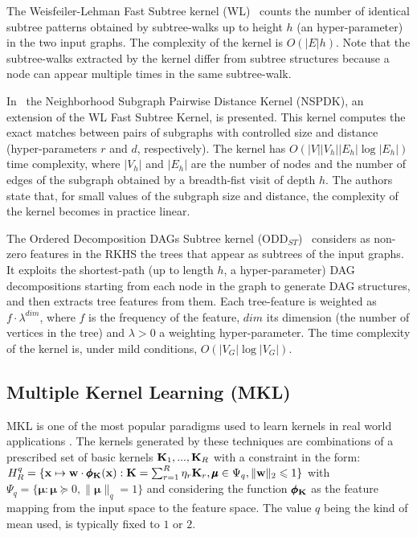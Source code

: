\documentclass{esannV2}
\newcommand{\xx}{{\bf x}}
\newcommand{\KK}{{\bf K}}
\newcommand{\1}{{\bf 1}}
\newcommand{\mmu}{\pmb{\mu}}
\newcommand{\pphi}{\pmb{\phi}}
\begin{document}
The Weisfeiler-Lehman Fast Subtree kernel (WL)~\cite{Shervashidze2011}  counts the number of identical subtree patterns obtained by subtree-walks up to height $h$ (an hyper-parameter) in the two input graphs. The complexity of the kernel is $O(|E|h)$. 
Note that the subtree-walks extracted by the kernel differ from  subtree structures because a node can appear multiple times in the same subtree-walk.

In~\cite{Costa2010} the Neighborhood Subgraph Pairwise Distance Kernel (NSPDK), an extension of the WL Fast Subtree Kernel, is presented. This kernel computes the exact matches between pairs of subgraphs with controlled size and distance (hyper-parameters $r$ and $d$, respectively). 
The kernel has $O(|V| |V_h| |E_h| \log |E_h|)$ time complexity, where $|V_h|$ and $|E_h|$ are the number of nodes and the number of edges of the subgraph obtained by a breadth-fist visit of depth $h$. 
The authors state that, for small values of the subgraph size and distance, the complexity of the kernel becomes in practice linear.

The Ordered Decomposition DAGs Subtree kernel (ODD$_{ST}$)~\cite{Dasan2012,DaSanMartino2016} considers as non-zero features in the RKHS the trees that appear as subtrees of the input graphs.
It exploits the shortest-path (up to length $h$, a hyper-parameter) DAG decompositions starting from each node in the graph to generate DAG structures, and then extracts tree features from them.
Each tree-feature is weighted as $f \cdot \lambda^{dim}$, where $f$ is the frequency of the feature, $dim$ its dimension (the number of vertices in the tree) and $\lambda>0$ a weighting hyper-parameter.
The time complexity of the kernel is, under mild conditions, $O(|V_G| \log |V_G|)$.%

\subsection{Multiple Kernel Learning (MKL)}
\label{MKL}
MKL \cite{Bach2004,Gonen2011} is one of the most popular paradigms used to learn kernels in real world applications \cite{Bucak2014,Castro2014}. %
The kernels generated by these techniques are combinations of a prescribed set of basic kernels $\KK_1,...,\KK_R$ with a constraint in the form:
$
	H_R^q = \{ \xx \mapsto \textbf{w} \cdot \pphi_\KK(\xx) : \KK = \sum_{r=1}^R \eta_r \KK_r, \mmu \in \Psi_q, \|\textbf{w}\|_2 \leqslant 1 \}
$
with $\Psi_q = \{ \mmu : \mmu \succcurlyeq 0, \| \mmu \|_q = 1 \}$ and considering the function $\pphi_\KK$ as the feature mapping from the input space to the feature space. The value $q$ being the kind of mean used, is typically fixed to $1$ or $2$.
\end{document}
